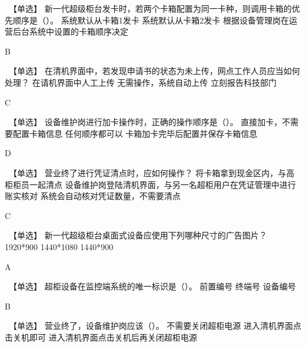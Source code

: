 \documentclass[kindlepaper]{BHCexam4kindle}
\begin{document}
\begin{questions}
\qs　【单选】 新一代超级柜台发卡时，若两个卡箱配置为同一卡种，则调用卡箱的优先顺序是（）。 \xx
{} {  系统默认从卡箱1发卡 } { 系统默认从卡箱2发卡 } { 根据设备管理岗在运营后台系统中设置的卡箱顺序决定 }
\begin{solution} B \end{solution}
\qs　【单选】 在清机界面中，若发现申请书的状态为未上传，网点工作人员应当如何处理？ \xx
{} {  在请机界面中人工上传 } { 无需操作，系统自动上传 } { 立刻报告科技部门 }
\begin{solution} C \end{solution}
\qs　【单选】 设备维护岗进行加卡操作时，正确的操作顺序是（）。 \xx
{} {  直接加卡，不需要配置卡箱信息 } { 任何顺序都可以 } { 卡箱加卡完毕后配置并保存卡箱信息 }
\begin{solution} D \end{solution}
\qs　【单选】 营业终了进行凭证清点时，应如何操作？ \xx
{} {  将卡箱拿到现金区内，与高柜柜员一起清点 } { 设备维护岗登陆清机界面，与另一名超柜用户在凭证管理中进行账实核对 } { 系统会自动核对凭证数量，不需要清点 }
\begin{solution} C \end{solution}
\qs　【单选】 新一代超级柜台桌面式设备应使用下列哪种尺寸的广告图片？ \xx
{} {  1920*900 } { 1440*1080 } { 1440*900 }
\begin{solution} A \end{solution}
\qs　【单选】 超柜设备在监控端系统的唯一标识是（）。 \xx
{} {  前置编号 } { 终端号 } { 设备编号 }
\begin{solution} B \end{solution}
\qs　【单选】 营业终了，设备维护岗应该（）。 \xx
{} {  不需要关闭超柜电源 } { 进入清机界面点击关机即可 } { 进入清机界面点击关机后再关闭超柜电源 }

\end{questions}
\end{document}

